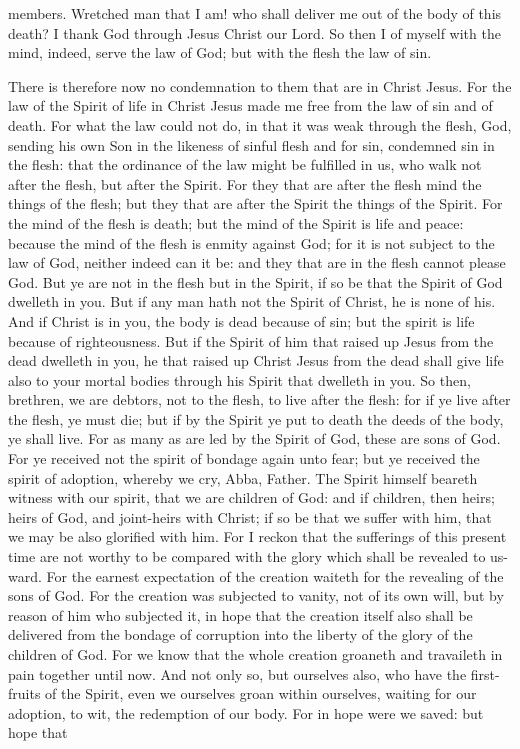 members. Wretched man that I am! who shall deliver me out of the body of this death? I thank God through Jesus Christ our Lord. So then I of myself with the mind, indeed, serve the law of God; but with the flesh the law of sin. 

There is therefore now no condemnation to them that are in Christ Jesus. For the law of the Spirit of life in Christ Jesus made me free from the law of sin and of death. For what the law could not do, in that it was weak through the flesh, God, sending his own Son in the likeness of sinful flesh and for sin, condemned sin in the flesh: that the ordinance of the law might be fulfilled in us, who walk not after the flesh, but after the Spirit. For they that are after the flesh mind the things of the flesh; but they that are after the Spirit the things of the Spirit. For the mind of the flesh is death; but the mind of the Spirit is life and peace: because the mind of the flesh is enmity against God; for it is not subject to the law of God, neither indeed can it be: and they that are in the flesh cannot please God. But ye are not in the flesh but in the Spirit, if so be that the Spirit of God dwelleth in you. But if any man hath not the Spirit of Christ, he is none of his. And if Christ is in you, the body is dead because of sin; but the spirit is life because of righteousness. But if the Spirit of him that raised up Jesus from the dead dwelleth in you, he that raised up Christ Jesus from the dead shall give life also to your mortal bodies through his Spirit that dwelleth in you.  So then, brethren, we are debtors, not to the flesh, to live after the flesh: for if ye live after the flesh, ye must die; but if by the Spirit ye put to death the deeds of the body, ye shall live. For as many as are led by the Spirit of God, these are sons of God. For ye received not the spirit of bondage again unto fear; but ye received the spirit of adoption, whereby we cry, Abba, Father. The Spirit himself beareth witness with our spirit, that we are children of God: and if children, then heirs; heirs of God, and joint-heirs with Christ; if so be that we suffer with him, that we may be also glorified with him.  For I reckon that the sufferings of this present time are not worthy to be compared with the glory which shall be revealed to us-ward. For the earnest expectation of the creation waiteth for the revealing of the sons of God. For the creation was subjected to vanity, not of its own will, but by reason of him who subjected it, in hope that the creation itself also shall be delivered from the bondage of corruption into the liberty of the glory of the children of God. For we know that the whole creation groaneth and travaileth in pain together until now. And not only so, but ourselves also, who have the first-fruits of the Spirit, even we ourselves groan within ourselves, waiting for our adoption, to wit, the redemption of our body. For in hope were we saved: but hope that 